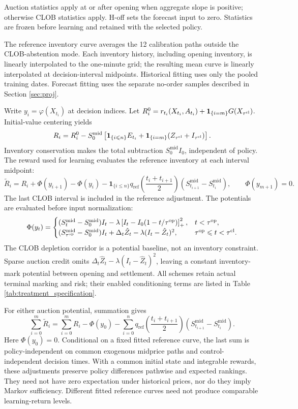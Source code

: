 \documentclass[11pt]{article}
\begin{document}
Auction statistics apply at or after opening when aggregate slope is positive; otherwise CLOB statistics apply. H-off sets the forecast input to zero. Statistics are frozen before learning and retained with the selected policy.\vspace{0.5em}

The reference inventory curve averages the 12 calibration paths outside the CLOB-abstention mode. Each inventory history, including opening inventory, is linearly interpolated to the one-minute grid; the resulting mean curve is linearly interpolated at decision-interval midpoints. Historical fitting uses only the pooled training dates. Forecast fitting uses the separate no-order samples described in Section \ref{sec:proj}.\vspace{0.5em}

Write $y_i=\varphi(X_{t_i})$ at decision indices. Let $R_i^0=r_{t_i}(X_{t_i},A_{t_i})+\mathbf1_{\{i=m\}}G(X_{\tau^{\mathrm{cl}}})$. Initial-value centering yields
\[
R_i=R_i^0-S_0^{\mathrm{mid}}\left[\mathbf1_{\{i\leqslant n\}}E_{t_i}
+\mathbf1_{\{i=m\}}(Z_{\tau^{\mathrm{cl}}}+I_{\tau^{\mathrm{cl}}})\right].
\]
Inventory conservation makes the total subtraction $S_0^{\mathrm{mid}}I_0$, independent of policy. The reward used for learning evaluates the reference inventory at each interval midpoint:
\[
\tilde R_i=R_i+\Phi(y_{i+1})-\Phi(y_i)
-\mathbf1_{\{i\leqslant n\}}q_{\mathrm{ref}}\!\left(\frac{t_i+t_{i+1}}2\right)
\left(S_{t_{i+1}}^{\mathrm{mid}}-S_{t_i}^{\mathrm{mid}}\right),
\qquad\Phi(y_{m+1})=0.
\]
The last CLOB interval is included in the reference adjustment. The potentials are evaluated before input normalization:
\[
\Phi(y_t)=\begin{cases}
(S_t^{\mathrm{mid}}-S_0^{\mathrm{mid}})I_t
-\lambda\left[I_t-I_0(1-t/\tau^{\mathrm{op}})\right]_+^2,&t<\tau^{\mathrm{op}},\\
(S_{\tau^{\mathrm{op}}}^{\mathrm{mid}}-S_0^{\mathrm{mid}})I_t
+\Delta_t\hat Z_t-\lambda(I_t-\hat Z_t)^2,&\tau^{\mathrm{op}}\leqslant t<\tau^{\mathrm{cl}}.
\end{cases}
\]
The CLOB depletion corridor is a potential baseline, not an inventory constraint. Sparse auction credit omits $\Delta_t\hat Z_t-\lambda(I_t-\hat Z_t)^2$, leaving a constant inventory-mark potential between opening and settlement. All schemes retain actual terminal marking and risk; their enabled conditioning terms are listed in Table \ref{tab:treatment_specification}.\vspace{0.5em}

For either auction potential, summation gives
\[
\sum_{i=0}^{m}\tilde R_i
=\sum_{i=0}^{m}R_i-\Phi(y_0)
-\sum_{i=0}^{n}q_{\mathrm{ref}}\!\left(\frac{t_i+t_{i+1}}2\right)
\left(S_{t_{i+1}}^{\mathrm{mid}}-S_{t_i}^{\mathrm{mid}}\right).
\]
Here $\Phi(y_0)=0$. Conditional on a fixed fitted reference curve, the last sum is policy-independent on common exogenous midprice paths and control-independent decision times. With a common initial state and integrable rewards, these adjustments preserve policy differences pathwise and expected rankings. They need not have zero expectation under historical prices, nor do they imply Markov sufficiency. Different fitted reference curves need not produce comparable learning-return levels.\vspace{0.5em}
\end{document}
